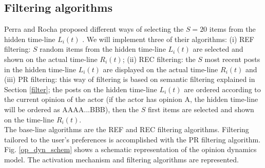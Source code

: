 \documentclass[11 pt , letterpaper , twoside , openright]{book}
\begin{document}
\subsection{Filtering algorithms}

Perra and Rocha proposed different ways of selecting the $S = 20$ items from the hidden time-line $L_i(t)$ \cite{Perra2019}. We will implement three of their algorithms: (i) REF filtering: $S$ random items from the hidden time-line $L_i(t)$ are selected and shown on the actual time-line $R_i(t)$; (ii) REC filtering: the $S$ most recent posts in the hidden time-line $L_i(t)$ are displayed on the actual time-line $R_i(t)$ and (iii) PR filtering: this way of filtering is based on semantic filtering explained in Section \ref{filter}; the posts on the hidden time-line $L_i(t)$ are ordered according to the current opinion of the actor (if the actor has opinion A, the hidden time-line will be ordered as AAAA...BBB), then the $S$ first items are selected and shown on the time-line $R_i(t)$.\\
\newline
The base-line algorithms are the REF and REC filtering algorithms. Filtering tailored to the user's preferences is accomplished with the PR filtering algorithm.\\
\newline
Fig. \ref{op_dyn_schem} shows a schematic representation of the opinion dynamics model. The activation mechanism and filtering algorithms are represented. 
\end{document}
